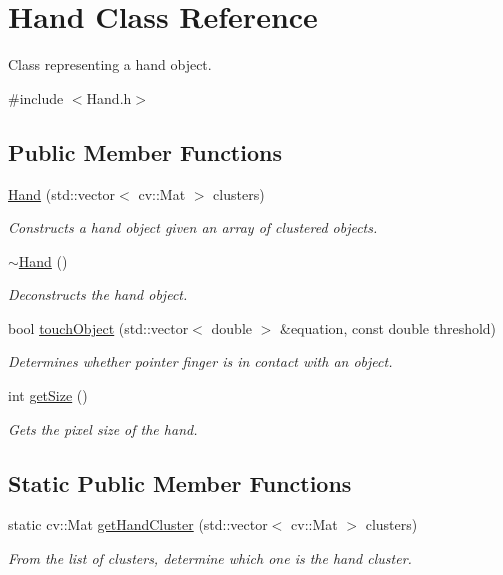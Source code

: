 \hypertarget{class_hand}{}\section{Hand Class Reference}
\label{class_hand}


Class representing a hand object.  




{\ttfamily \#include $<$Hand.\+h$>$}

\subsection*{Public Member Functions}
\begin{DoxyCompactItemize}
\item 
\hyperlink{class_hand_a77bc39dbcb8eee3927dd326b22bd3ae7}{Hand} (std\+::vector$<$ cv\+::\+Mat $>$ clusters)
\begin{DoxyCompactList}\small\item\em Constructs a hand object given an array of clustered objects. \end{DoxyCompactList}\item 
\hyperlink{class_hand_a7ff29a6f23f98c5e57f44d23a76912be}{$\sim$\+Hand} ()
\begin{DoxyCompactList}\small\item\em Deconstructs the hand object. \end{DoxyCompactList}\item 
bool \hyperlink{class_hand_aad89c3e47921cb0c39430f4501238088}{touch\+Object} (std\+::vector$<$ double $>$ \&equation, const double threshold)
\begin{DoxyCompactList}\small\item\em Determines whether pointer finger is in contact with an object. \end{DoxyCompactList}\item 
int \hyperlink{class_hand_abd15e5110f6a2f0809e2064c808a829c}{get\+Size} ()
\begin{DoxyCompactList}\small\item\em Gets the pixel size of the hand. \end{DoxyCompactList}\end{DoxyCompactItemize}
\subsection*{Static Public Member Functions}
\begin{DoxyCompactItemize}
\item 
static cv\+::\+Mat \hyperlink{class_hand_aa3ada30b516302dbabe5813f8eb6ac1a}{get\+Hand\+Cluster} (std\+::vector$<$ cv\+::\+Mat $>$ clusters)
\begin{DoxyCompactList}\small\item\em From the list of clusters, determine which one is the hand cluster. \end{DoxyCompactList}\end{DoxyCompactItemize}
